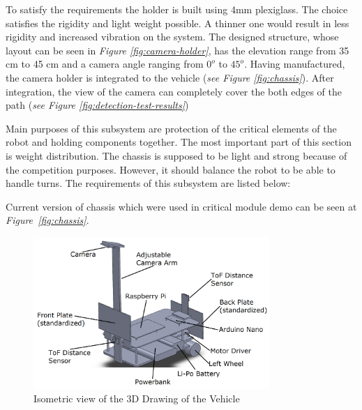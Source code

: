 \documentclass[a4paper,12pt]{article}
\begin{document}
\begin{enumerate}
To satisfy the requirements the holder is built using 4mm plexiglass. The choice satisfies the rigidity and light weight possible. A thinner one would result in less rigidity and increased vibration on the system. The designed structure, whose layout can be seen in \textit{Figure \ref{fig:camera-holder}}, has the elevation range from 35 cm to 45 cm and a camera angle ranging from $0^o$ to $45^o$. Having manufactured, the camera holder is integrated to the vehicle (\textit{see Figure \ref{fig:chassis}}). After integration, the view of the camera can completely cover the both edges of the path (\textit{see Figure \ref{fig:detection-test-results}})


Main purposes of this subsystem are protection of the critical elements of the robot and holding components together. The most important part of this section is weight distribution. The chassis is supposed to be light and strong because of the competition purposes. However, it should balance the robot to be able to handle turns. The requirements of this subsystem are listed below:


Current version of chassis which were used in critical module demo can be seen at \textit{Figure~\ref{fig:chassis}}.



\begin{figure}[h]

\includegraphics[width=0.8\textwidth,center]{images/chassis1}

\caption{Isometric view of the 3D Drawing of the Vehicle \label{fig:isom} }

\end{figure}






\end{enumerate}
\end{document}
